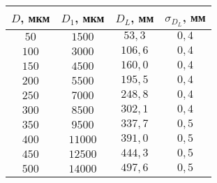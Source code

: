 \begin{tabular}{| c | c | c | c |}
\hline
$D$, мкм & $D_1$, мкм & $D_L$, мм & $\sigma_{D_L}$, мм\\
\hline
$50$ & $1500$ & $53,3$ & $0,4$\\
\hline
$100$ & $3000$ & $106,6$ & $0,4$\\
\hline
$150$ & $4500$ & $160,0$ & $0,4$\\
\hline
$200$ & $5500$ & $195,5$ & $0,4$\\
\hline
$250$ & $7000$ & $248,8$ & $0,4$\\
\hline
$300$ & $8500$ & $302,1$ & $0,4$\\
\hline
$350$ & $9500$ & $337,7$ & $0,5$\\
\hline
$400$ & $11000$ & $391,0$ & $0,5$\\
\hline
$450$ & $12500$ & $444,3$ & $0,5$\\
\hline
$500$ & $14000$ & $497,6$ & $0,5$\\
\hline
\end{tabular}
